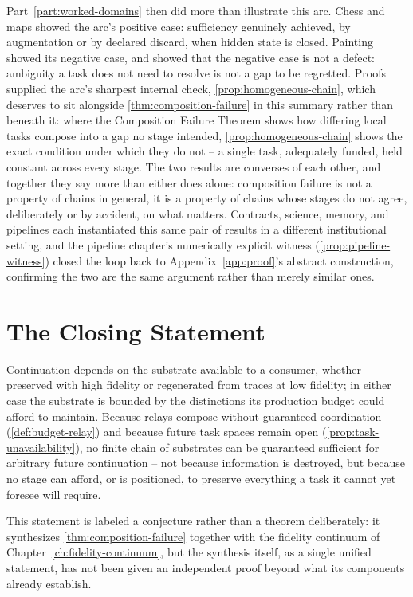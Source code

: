 Part~\ref{part:worked-domains} then did more than illustrate this arc.
Chess and maps showed the arc's positive case: sufficiency genuinely
achieved, by augmentation or by declared discard, when hidden state is
closed. Painting showed its negative case, and showed that the negative
case is not a defect: ambiguity a task does not need to resolve is not a
gap to be regretted. Proofs supplied the arc's sharpest internal check,
\cref{prop:homogeneous-chain}, which deserves to sit alongside
\cref{thm:composition-failure} in this summary rather than beneath it:
where the Composition Failure Theorem shows how differing local tasks
compose into a gap no stage intended, \cref{prop:homogeneous-chain}
shows the exact condition under which they do not -- a single task,
adequately funded, held constant across every stage. The two results are
converses of each other, and together they say more than either does
alone: composition failure is not a property of chains in general, it is
a property of chains whose stages do not agree, deliberately or by
accident, on what matters. Contracts, science, memory, and pipelines
each instantiated this same pair of results in a different institutional
setting, and the pipeline chapter's numerically explicit witness
(\cref{prop:pipeline-witness}) closed the loop back to
Appendix~\ref{app:proof}'s abstract construction, confirming the two are
the same argument rather than merely similar ones.

\section{The Closing Statement}

\begin{conjecture}
\label{conj:closing}
Continuation depends on the substrate available to a consumer, whether
preserved with high fidelity or regenerated from traces at low fidelity;
in either case the substrate is bounded by the distinctions its
production budget could afford to maintain. Because relays compose
without guaranteed coordination (\cref{def:budget-relay}) and because
future task spaces remain open (\cref{prop:task-unavailability}), no
finite chain of substrates can be guaranteed sufficient for arbitrary
future continuation -- not because information is destroyed, but
because no stage can afford, or is positioned, to preserve everything a
task it cannot yet foresee will require.
\end{conjecture}

This statement is labeled a conjecture rather than a theorem
deliberately: it synthesizes \cref{thm:composition-failure} together
with the fidelity continuum of Chapter~\ref{ch:fidelity-continuum}, but
the synthesis itself, as a single unified statement, has not been given
an independent proof beyond what its components already establish.


